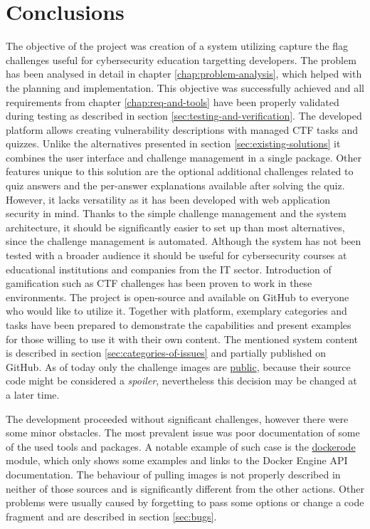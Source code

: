 \chapter{Conclusions}

The objective of the project was creation of a system utilizing capture the flag challenges useful for cybersecurity education targetting developers. The problem has been analysed in detail in chapter \ref{chap:problem-analysis}, which helped with the planning and implementation. This objective was successfully achieved and all requirements from chapter \ref{chap:req-and-tools} have been properly validated during testing as described in section \ref{sec:testing-and-verification}. The developed platform allows creating vulnerability descriptions with managed CTF tasks and quizzes. Unlike the alternatives presented in section \ref{sec:existing-solutions} it combines the user interface and challenge management in a single package. Other features unique to this solution are the optional additional challenges related to quiz answers and the per-answer explanations available after solving the quiz. However, it lacks versatility as it has been developed with web application security in mind. Thanks to the simple challenge management and the system architecture, it should be significantly easier to set up than most alternatives, since the challenge management is automated.
Although the system has not been tested with a broader audience it should be useful for cybersecurity courses at educational institutions and companies from the IT sector. Introduction of gamification such as CTF challenges has been proven to work in these environments. The project is open-source and available on GitHub to everyone who would like to utilize it. Together with platform, exemplary categories and tasks have been prepared to demonstrate the capabilities and present examples for those willing to use it with their own content. The mentioned system content is described in section \ref{sec:categories-of-issues} and partially published on GitHub. As of today only the challenge images are \href{https://github.com/krzysdz?ecosystem=container&tab=packages}{public}, because their source code might be considered a \textit{spoiler}, nevertheless this decision may be changed at a later time.

The development proceeded without significant challenges, however there were some minor obstacles. The most prevalent issue was poor documentation of some of the used tools and packages. A notable example of such case is the \href{https://github.com/apocas/dockerode}{dockerode} module, which only shows some examples and links to the Docker Engine API documentation. The behaviour of pulling images is not properly described in neither of those sources and is significantly different from the other actions. Other problems were usually caused by forgetting to pass some options or change a code fragment and are described in section \ref{sec:bugs}.

